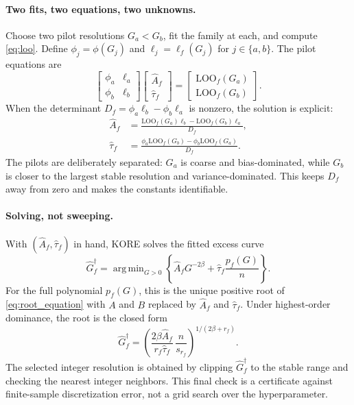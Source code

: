 \documentclass{article}
\DeclareMathOperator*{\argmin}{arg\,min}
\newcommand{\KORE}{\textsc{KORE}}
\newcommand{\LoO}{\mathrm{LOO}}
\begin{document}
\paragraph{Two fits, two equations, two unknowns.}
Choose two pilot resolutions $G_a<G_b$, fit the family at each, and compute \eqref{eq:loo}. Define
$\phi_j=\phi(G_j)$ and $\ell_j=\ell_f(G_j)$ for $j\in\{a,b\}$. The pilot equations are
\begin{equation}
\begin{bmatrix}
\phi_a & \ell_a \\[2pt]
\phi_b & \ell_b
\end{bmatrix}
\begin{bmatrix}
\widehat A_f \\[2pt]
\widehat\tau_f
\end{bmatrix}
=
\begin{bmatrix}
\LoO_f(G_a) \\[2pt]
\LoO_f(G_b)
\end{bmatrix}.
\label{eq:pilot_system}
\end{equation}
When the determinant $D_f=\phi_a\ell_b-\phi_b\ell_a$ is nonzero, the solution is explicit:
\begin{align}
    \widehat A_f
    &=\frac{\LoO_f(G_a)\ell_b-\LoO_f(G_b)\ell_a}{D_f},
    \label{eq:Af_closed}\\[4pt]
    \widehat\tau_f
    &=\frac{\phi_a\LoO_f(G_b)-\phi_b\LoO_f(G_a)}{D_f}.
    \label{eq:Bf_closed}
\end{align}
The pilots are deliberately separated: $G_a$ is coarse and bias-dominated, while $G_b$ is closer to the largest stable resolution and variance-dominated. This keeps $D_f$ away from zero and makes the constants identifiable.

\paragraph{Solving, not sweeping.}
With $(\widehat A_f,\widehat\tau_f)$ in hand, \KORE{} solves the fitted excess curve
\begin{equation}
    \widehat G_f^\dagger
    =\argmin_{G>0}\left\{\widehat A_fG^{-2\beta}+\widehat\tau_f\frac{p_f(G)}{n}\right\}.
    \label{eq:predicted_g}
\end{equation}
For the full polynomial $p_f(G)$, this is the unique positive root of \eqref{eq:root_equation} with $A$ and $B$ replaced by $\widehat A_f$ and $\widehat\tau_f$. Under highest-order dominance, the root is the closed form
\begin{equation}
    \widehat G_f^\dagger
    =\left(\frac{2\beta\widehat A_f}{r_f\widehat\tau_f}\,\frac{n}{s_{r_f}}\right)^{1/(2\beta+r_f)}.
    \label{eq:plugin_closed_form}
\end{equation}
The selected integer resolution is obtained by clipping $\widehat G_f^\dagger$ to the stable range and checking the nearest integer neighbors. This final check is a certificate against finite-sample discretization error, not a grid search over the hyperparameter.
\end{document}
